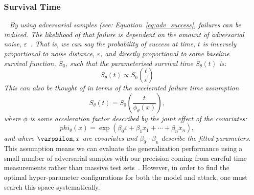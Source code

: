 \documentclass[conference]{IEEEtran}
\newcommand{\cm}[1]{\textit{{\color{blue}#1}}}
\begin{document}
\subsubsection{Survival Time}
\label{accelerated}
~\cm{
By using adversarial samples (see: Equation~\ref{eq:adv_success}, failures can be induced. The likelihood of that failure is dependent on the amount of adversarial noise, $\varepsilon$~\cite{meyers_aft}. That is, we can say the probability of success at time, $t$ is inversely proportional to  noise distance, $\varepsilon$, and  directly proportional to some baseline survival function, $S_0$, such that the parameterised survival time $S_{\theta}(t)$ is:
$$
S_{\theta}(t) \propto  S_0 \left( \frac{t}{\varepsilon} \right)
$$
This can also be thought of in terms of the accelerated failure time assumption~\cite{kleinbaum1996survival}
\begin{equation} \label{assumption}
    S_\theta(t) = S_0 \left( \frac{t}{\phi_\theta(x)} \right),
\end{equation}
where $\phi$ is some acceleration factor described by the joint effect of the covariates:
$$
phi_{\theta}(x) = \exp( \beta_0 \varepsilon + \beta_1 x_1 + \cdots + \beta_n x_n),
$$ 
and where $\varpsilon, x$ are covariates and $\beta_0 \cdots \beta_n$ describe the fitted parameters.
}
This assumption means we can evaluate the generalization performance using a small number of adversarial samples with our precision coming from careful time measurements rather than massive test sets~\cite{kleinbaum1996survival,meyers_aft}.
However, in order to find the optimal hyper-parameter configurations for both the model and attack, one must search this space systematically.
\end{document}
